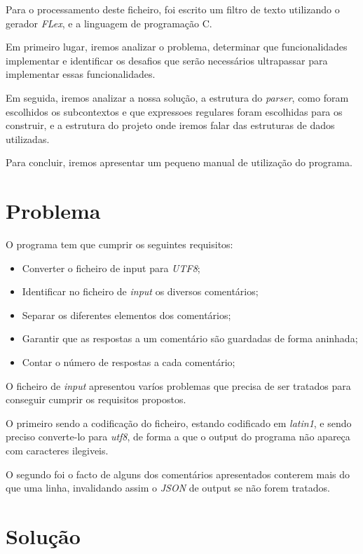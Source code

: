 \documentclass[a4paper]{report}
\begin{document}
Para o processamento deste ficheiro, foi escrito um filtro de texto utilizando 
o gerador \textit{FLex}, e a linguagem de programação C.

Em primeiro lugar, iremos analizar o problema, determinar que funcionalidades 
implementar e identificar os desafios que serão necessários ultrapassar
para implementar essas funcionalidades.

Em seguida, iremos analizar a nossa solução, a estrutura do \textit{parser},
como foram escolhidos os subcontextos e que expressoes regulares foram
escolhidas para os construir, e a estrutura do projeto onde iremos falar
das estruturas de dados utilizadas.

Para concluir, iremos apresentar um pequeno manual de utilização do programa.

\chapter{Problema}

O programa tem que cumprir os seguintes requisitos:
\begin{itemize}
    \item Converter o ficheiro de input para \textit{UTF8};
    \item Identificar no ficheiro de \textit{input} os diversos comentários;
    \item Separar os diferentes elementos dos comentários;
    \item Garantir que as respostas a um comentário são guardadas de forma
        aninhada;
    \item Contar o número de respostas a cada comentário;
\end{itemize}

O ficheiro de \textit{input} apresentou varíos problemas que precisa de ser
tratados para conseguir cumprir os requisitos propostos.

O primeiro sendo a codificação do ficheiro, estando codificado em \textit{latin1},
e sendo preciso converte-lo para \textit{utf8}, de forma a que o output do 
programa não apareça com caracteres ilegiveis.

O segundo foi o facto de alguns dos comentários apresentados conterem mais do que
uma linha, invalidando assim o \textit{JSON} de output se não forem tratados.

\chapter{Solução}
\end{document}
